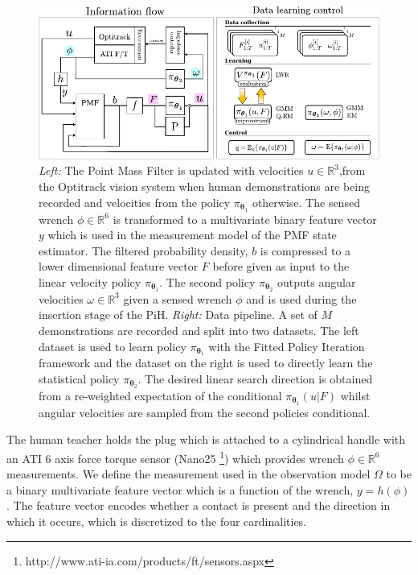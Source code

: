 \documentclass[final,5p,times,twocolumn]{elsarticle}
\newcommand{\Param}{\boldsymbol{\theta}}
\begin{document}
\begin{figure}\label{fig:data-flow}
\centering
\includegraphics[width=0.9\linewidth]{./Figure/parameters-system-only-two-v2.pdf}
 \caption{\textit{Left:} The Point Mass Filter is updated with velocities $u \in \mathbb{R}^3$,from the 
 Optitrack vision system when human demonstrations are being recorded and velocities from the policy
 $\pi_{\Param_1}$ otherwise. The sensed wrench $\phi \in \mathbb{R}^6$ is transformed to a multivariate binary 
 feature vector $y$ which is used in the measurement model of the PMF state estimator. The filtered probability density, $b$ is compressed to a lower 
 dimensional feature vector $F$ before given as input to the linear velocity policy $\pi_{\Param_1}$. The second policy 
 $\pi_{\Param_2}$ outputs angular velocities $\omega \in \mathbb{R}^3$ given a sensed wrench $\phi$ and is used during the insertion stage of the PiH. 
 \textit{Right:} Data pipeline. A set of $M$ demonstrations are recorded and split into two datasets. The left 
 dataset is used to learn policy $\pi_{\Param_1}$ with the Fitted Policy Iteration framework and the dataset on the right is used 
 to directly learn the statistical policy $\pi_{\Param_2}$. The desired linear search direction is obtained from a re-weighted expectation 
 of the conditional $\pi_{\Param_1}(u|F)$ whilst angular velocities are sampled from the second policies conditional.}
\end{figure}


The human teacher holds the plug which is attached to a cylindrical handle with 
an ATI 6 axis force torque sensor (Nano25 \footnote{http://www.ati-ia.com/products/ft/sensors.aspx}) 
which provides wrench $\phi \in \mathbb{R}^6$ measurements. We define the measurement used in the observation model $\Omega$
to be a binary multivariate feature vector which is a function of the wrench, $y = h(\phi)$. The feature vector encodes whether a contact is present 
and the direction in which it occurs, which is discretized to the four cardinalities.
\end{document}
